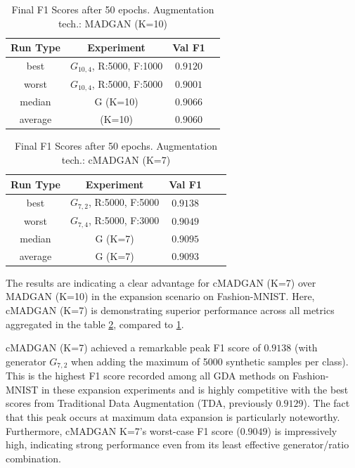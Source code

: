 \begin{table}[H]
	\vspace{-1.5em}
	\centering
	\begin{tabular}{|c|c|c|c|}
		\hline
		Run Type & Experiment & Val F1 \\ \hline
		best & \(G_{10, 4}\), R:5000, F:1000 & $0.9120$\\ \hline
		worst & \(G_{10, 4}\), R:5000, F:5000 & $0.9001$\\ \hline
		median & G (K=10) & $0.9066$\\ \hline
		average & (K=10) & $0.9060$
		\\ \hline
	\end{tabular}
    \caption{Final F1 Scores after 50 epochs. Augmentation tech.: MADGAN (K=10)}
        \label{tab:res_expansion_fashion_cmadgan_vs_madgan__madgan}
\end{table}
\begin{table}[H]
	\centering
	\vspace{-1.5em}
	\begin{tabular}{|c|c|c|c|c|}
		\hline
		Run Type & Experiment & Val F1 \\ \hline
		best & \(G_{7, 2}\), R:5000, F:5000 & $0.9138$\\ \hline
		worst & \(G_{7, 4}\), R:5000, F:3000 & $0.9049$\\ \hline
		median & G (K=7) & $0.9095$\\ \hline
		average & G (K=7) & $0.9093$
		\\ \hline
	\end{tabular}
    \caption{Final F1 Scores after 50 epochs. Augmentation tech.: cMADGAN (K=7)}
        \label{tab:res_expansion_fashion_cmadgan_vs_madgan__cmadgan}
\end{table}

The results are indicating a clear advantage for cMADGAN (K=7) over MADGAN (K=10) in the expansion scenario on Fashion-MNIST. Here, cMADGAN (K=7) is demonstrating superior performance across all metrics aggregated in the table \ref{tab:res_expansion_fashion_cmadgan_vs_madgan__cmadgan}, compared to \ref{tab:res_expansion_fashion_cmadgan_vs_madgan__madgan}.

cMADGAN (K=7) achieved a remarkable peak F1 score of $0.9138$ (with generator \(G_{7,2}\) when adding the maximum of 5000 synthetic samples per class). This is the highest F1 score recorded among all GDA methods on Fashion-MNIST in these expansion experiments and is highly competitive with the best scores from Traditional Data Augmentation (TDA, previously $0.9129$). The fact that this peak occurs at maximum data expansion is particularly noteworthy. Furthermore, cMADGAN K=7's worst-case F1 score ($0.9049$) is impressively high, indicating strong performance even from its least effective generator/ratio combination.

